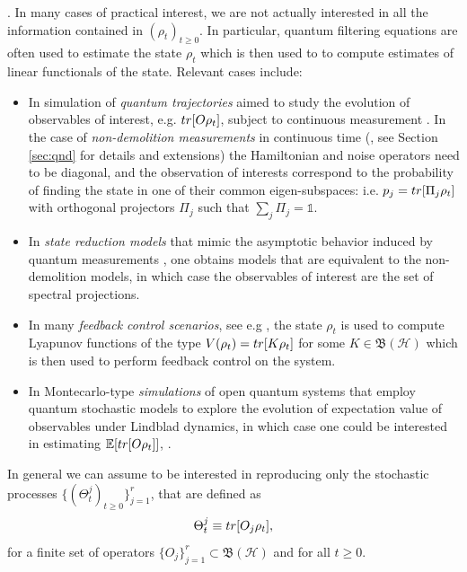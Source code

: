 \documentclass[aihp,12pt]{imsart}
\newcommand{\Hc}{\mathcal{H}}
\newcommand{\Eb}{\mathbb{E}}
\newcommand{\Bf}{\mathfrak{B}}
\newcommand{\one}{\mathbb{1}}
\newcommand{\tr}{{\rm tr}}
\theoremstyle{theorem}
\theoremstyle{definition}
\theoremstyle{remark}
\begin{document}
. 
In many cases of practical interest, we are not actually interested in all the information contained in $(\rho_t)_{t\geq0}$. In particular, quantum filtering equations are often used to estimate the state $\rho_t$ which is then used to to compute estimates of linear functionals of the state. Relevant cases include:
\begin{itemize}
    \item In simulation of {\em quantum trajectories} aimed to study the evolution of observables of interest, e.g. $\tr[O \rho_t]$, subject to continuous measurement \cite{tirrito_full_2023}. In the case of {\em non-demolition measurements} in continuous time (\cite{Benoist_2014,bauer2013repeated,bauer2011convergence,cardona2020exponential,benoist2024exponentially}, see Section \ref{sec:qnd} for details and extensions) the Hamiltonian and noise operators need to be diagonal, and the observation of interests correspond to the probability of finding the state in one of their  common eigen-subspaces: i.e. $p_j = \tr[\Pi_j \rho_t]$ with orthogonal projectors $\Pi_j$ such that $\sum_j \Pi_j = \one$.
    
    \item In {\em state reduction models} that mimic the asymptotic behavior induced by quantum measurements \cite{adler2001martingale, Adler_2008}, one obtains models that are equivalent to the non-demolition models, in which case the observables of interest are the  set of spectral projections. 
    \item  In many {\em feedback control scenarios}, see e.g \cite{amini2012stabilization,grigoletto2021stabilization,liang2022switching, benoist2017exponential}, the state $\rho_t$ is used to compute Lyapunov functions of the type $V(\rho_t) = \tr[K\rho_t]$ for some $K\in\Bf(\Hc)$ which is then used to perform feedback control on the system.
   
    \item In Montecarlo-type {\em simulations} of open quantum systems that employ quantum stochastic models to explore the evolution of expectation value of observables under Lindblad dynamics, in which case one could be interested in estimating $\Eb[\tr[O\rho_t]]$, \cite{PhysRevB.105.064305}.
    
\end{itemize}
In general we can assume to be interested in reproducing only the stochastic processes $\{(\Theta_t^j)_{t\geq0}\}_{j=1}^r$, that are defined as 
\begin{equation}
    \Theta_t^j \equiv \tr[O_j\rho_t],
    \label{eq:output_equation}
\end{equation} for a finite set of operators $\{O_j\}_{j=1}^r\subset\Bf(\Hc)$ and for all $t\geq0$. 
\end{document}
